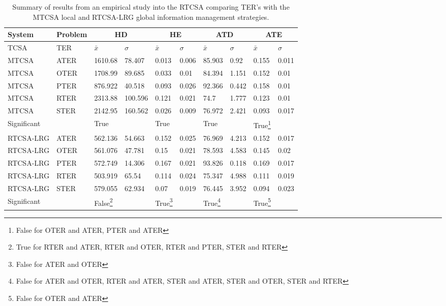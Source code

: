 \begin{table}[H]
	\centering\small
		\begin{minipage}{\textwidth} 
		\begin{tabular}{llllllllll}
		\toprule
		\textbf{System} & \textbf{Problem} & \multicolumn{2}{c}{\textbf{HD}} & \multicolumn{2}{c}{\textbf{HE}} & \multicolumn{2}{c}{\textbf{ATD}} & \multicolumn{2}{c}{\textbf{ATE}} \\ 
		\midrule
		TCSA & TER & $\bar{x}$ & $\sigma$ & $\bar{x}$ & $\sigma$ & $\bar{x}$ & $\sigma$ & $\bar{x}$ & $\sigma$ \\ 
		\toprule
		MTCSA & ATER & 1610.68 & 78.407 & 0.013 & 0.006 & 85.903 & 0.92 & 0.155 & 0.011 \\ 
		MTCSA & OTER & 1708.99 & 89.685 & 0.033 & 0.01 & 84.394 & 1.151 & 0.152 & 0.01 \\ 
		MTCSA & PTER & 876.922 & 40.518 & 0.093 & 0.026 & 92.366 & 0.442 & 0.158 & 0.01 \\ 
		MTCSA & RTER & 2313.88 & 100.596 & 0.121 & 0.021 & 74.7 & 1.777 & 0.123 & 0.01 \\ 
		MTCSA & STER & 2142.95 & 160.562 & 0.026 & 0.009 & 76.972 & 2.421 & 0.093 & 0.017 \\ 
		\multicolumn{2}{l}{Significant} & True &  & True &  & True &  & True\footnote{False for OTER and ATER, PTER and ATER} &  \\ 
		\midrule
		RTCSA-LRG & ATER & 562.136 & 54.663 & 0.152 & 0.025 & 76.969 & 4.213 & 0.152 & 0.017 \\ 
		RTCSA-LRG & OTER & 561.076 & 47.781 & 0.15 & 0.021 & 78.593 & 4.583 & 0.145 & 0.02 \\ 
		RTCSA-LRG & PTER & 572.749 & 14.306 & 0.167 & 0.021 & 93.826 & 0.118 & 0.169 & 0.017 \\ 
		RTCSA-LRG & RTER & 503.919 & 65.54 & 0.114 & 0.024 & 75.347 & 4.988 & 0.111 & 0.019 \\ 
		RTCSA-LRG & STER & 579.055 & 62.934 & 0.07 & 0.019 & 76.445 & 3.952 & 0.094 & 0.023 \\ 
		\multicolumn{2}{l}{Significant} & False\footnote{True for RTER and ATER, RTER and OTER, RTER and PTER, STER and RTER} & & True\footnote{False for ATER and OTER} & & True\footnote{False for ATER and OTER, RTER and ATER, STER and ATER, STER and OTER, STER and RTER} & & True\footnote{False for OTER and ATER} & \\ 
		\bottomrule
		\end{tabular}
		\end{minipage}
	\caption{Summary of results from an empirical study into the RTCSA comparing TER's with the MTCSA local and RTCSA-LRG global information management strategies.}
	\label{tab:tissues:rtcsa:results:ter}
\end{table}


